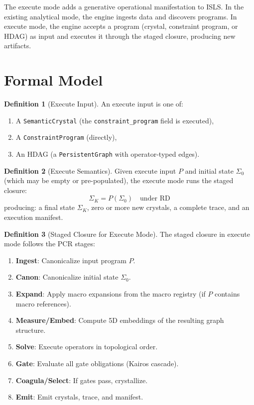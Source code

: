 \documentclass[11pt,a4paper,twoside]{article}
\theoremstyle{definition}
\newtheorem{definition}{Definition}[section]
\theoremstyle{plain}
\theoremstyle{remark}
\newcommand{\ISLS}{\textsf{ISLS}}
\begin{document}
The execute mode adds a generative operational manifestation to \ISLS{}.
In the existing analytical mode, the engine ingests data and discovers
programs. In execute mode, the engine accepts a program (crystal,
constraint program, or HDAG) as input and executes it through the staged
closure, producing new artifacts.

\section{Formal Model}\label{sec:exec:model}

\begin{definition}[Execute Input]\label{def:execinput}
An execute input is one of:
\begin{enumerate}[nosep,label=(\alph*)]
  \item A \texttt{SemanticCrystal} (the \texttt{constraint\_program}
        field is executed),
  \item A \texttt{ConstraintProgram} (directly),
  \item An HDAG (a \texttt{PersistentGraph} with operator-typed edges).
\end{enumerate}
\end{definition}

\begin{definition}[Execute Semantics]\label{def:execsem}
Given execute input $P$ and initial state $\Sigma_0$ (which may be
empty or pre-populated), the execute mode runs the staged closure:
\[
  \Sigma_K = P(\Sigma_0) \quad \text{under RD}
\]
producing: a final state $\Sigma_K$, zero or more new crystals, a
complete trace, and an execution manifest.
\end{definition}

\begin{definition}[Staged Closure for Execute Mode]\label{def:execstages}
The staged closure in execute mode follows the PCR stages:
\begin{enumerate}[nosep,label=(S\arabic*)]
  \item \textbf{Ingest}: Canonicalize input program $P$.
  \item \textbf{Canon}: Canonicalize initial state $\Sigma_0$.
  \item \textbf{Expand}: Apply macro expansions from the macro registry
        (if $P$ contains macro references).
  \item \textbf{Measure/Embed}: Compute 5D embeddings of the resulting
        graph structure.
  \item \textbf{Solve}: Execute operators in topological order.
  \item \textbf{Gate}: Evaluate all gate obligations (Kairos cascade).
  \item \textbf{Coagula/Select}: If gates pass, crystallize.
  \item \textbf{Emit}: Emit crystals, trace, and manifest.
\end{enumerate}
\end{definition}
\end{document}
